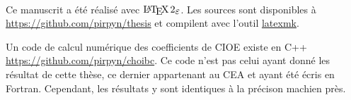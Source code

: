 ~{}

Ce manuscrit a été réalisé avec \(\LaTeXe\).
Les sources sont disponibles à \url{https://github.com/pirpyn/thesis} et compilent avec l'outil \href{https://mg.readthedocs.io/latexmk.html}{latexmk}. 

Un code de calcul numérique des coefficients de CIOE existe en C++ \url{https://github.com/pirpyn/choibc}.
Ce code n'est pas celui ayant donné les résultat de cette thèse, ce dernier appartenant au CEA et ayant été écris en Fortran. Cependant, les résultats y sont identiques à la précison machien près.
